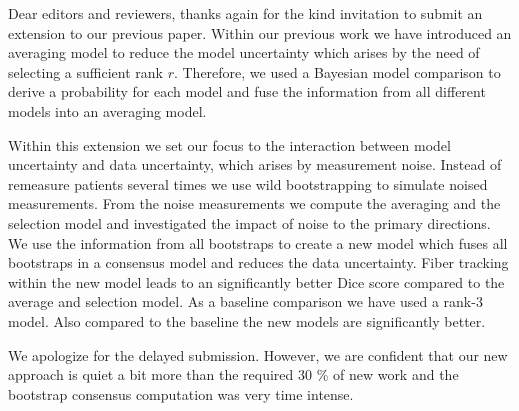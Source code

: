 \documentclass[a4paper]{article}
\begin{document}
Dear editors and reviewers,
thanks again for the kind invitation to submit an extension to our previous
paper. Within our previous work we have introduced an averaging model to reduce
the model uncertainty which arises by the need of selecting a sufficient rank
$r$. Therefore, we used a Bayesian model comparison to derive a probability for
each model and fuse the information from all different models into an averaging model. 

Within this extension we set our focus to the interaction between model
uncertainty and data uncertainty, which arises by
measurement noise. Instead of remeasure patients several times we use wild bootstrapping
to simulate noised measurements. From the noise measurements we compute the
averaging and the selection model and investigated the impact of noise to the
primary directions. We use the information from all bootstraps to create a new
model which fuses all bootstraps in a consensus model and reduces the data
uncertainty. Fiber tracking within the new model leads to an significantly
better Dice score compared to the average and selection model. As a baseline
comparison we have used a rank-$3$ model. Also compared to the baseline the new models are
significantly better.

We apologize for the delayed submission. However, we are confident that our new
approach is quiet a bit more than the required 30 \% of new work and the
bootstrap consensus computation was very time intense. 
\end{document}
